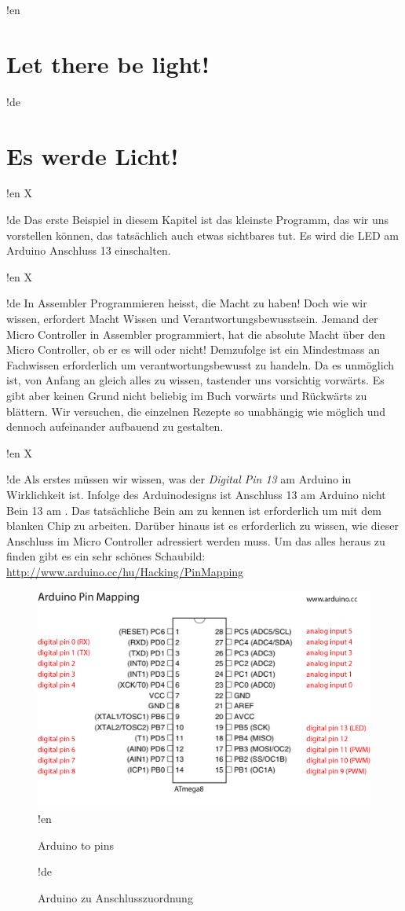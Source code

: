 !en \section{Let there be light!}
!de \section{Es werde Licht!}

!en X

!de Das erste Beispiel in diesem Kapitel ist das kleinste Programm, das wir uns vorstellen können, das tatsächlich auch etwas sichtbares tut. Es wird die LED am Arduino Anschluss 13 einschalten.



!en X

!de In Assembler Programmieren heisst, die Macht zu haben! Doch wie wir wissen, erfordert Macht Wissen und Verantwortungsbewusstsein. Jemand der Micro Controller in Assembler programmiert, hat die absolute Macht über den Micro Controller, ob er es will oder nicht! Demzufolge ist ein Mindestmass an Fachwissen erforderlich um verantwortungsbewusst zu handeln. Da es unmöglich ist, von Anfang an gleich alles zu wissen, tastender uns vorsichtig vorwärts. Es gibt aber keinen Grund nicht beliebig im Buch vorwärts und Rückwärts zu blättern. Wir versuchen, die einzelnen Rezepte so unabhängig wie möglich und dennoch aufeinander aufbauend zu gestalten.



!en X

!de Als erstes müssen wir wissen, was der \textit{Digital Pin 13} am Arduino in Wirklichkeit ist. Infolge des Arduinodesigns ist Anschluss 13 am Arduino nicht Bein 13 am \at{}. Das tatsächliche Bein am \at{} zu kennen ist erforderlich um mit dem blanken Chip zu arbeiten. Darüber hinaus ist es erforderlich zu wissen, wie dieser Anschluss im Micro Controller adressiert werden muss. Um das alles heraus zu finden gibt es ein sehr schönes Schaubild: \url{http://www.arduino.cc/hu/Hacking/PinMapping}


\begin{figure}[htbp]
  \centering
  \includegraphics[width=120mm]{Media/www-arduino-cc_Arduino-To-Atmega8-Pins.png}
!en   \caption{Arduino to \at  pins}
!de   \caption{Arduino zu \at  Anschlusszuordnung}
  \label{arduino-to-atmega-pins}
\end{figure}



